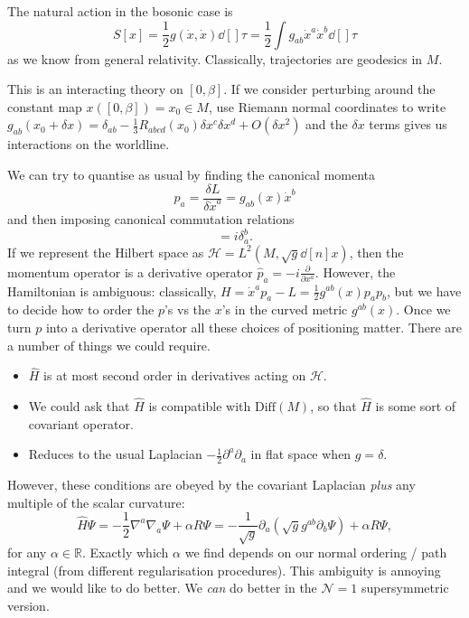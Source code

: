 The natural action in the bosonic case is
\begin{equation}
  S[x] = \frac{1}{2} g (\dot{x}, \dot{x}) \dd[]{\tau} = \frac{1}{2} \int g_{ab} \dot{x}^{a} \dot{x}^{b} \dd[]{\tau}
\end{equation}
as we know from general relativity.
Classically, trajectories are geodesics in $M$.
\begin{remark}
  This is an interacting theory on $[0, \beta]$. If we consider perturbing around the constant map $x([0, \beta]) = x_0 \in M$, use Riemann normal coordinates to write $g_{ab}(x_0 + \delta x) = \delta_{ab} - \frac{1}{3} R_{abcd} (x_0) \delta x^{c} \delta x^{d} + O(\delta x^2)$ and the $\delta x$ terms gives us interactions on the worldline.
\end{remark}
We can try to quantise as usual by finding the canonical momenta
\begin{equation}
  p_a = \frac{\delta L}{\delta \dot{x}^a} = g_{ab}(x) \dot{x}^b
\end{equation}
and then imposing canonical commutation relations
\begin{equation}
  [\hat{p}_a, \hat{x}^b] = i \delta^{b}_a.
\end{equation}
If we represent the Hilbert space as $\mathscr{H} = L^2 (M, \sqrt{g} \dd[n]{x})$, then the momentum operator is a derivative operator $\hat{p}_a = -i \frac{\partial }{\partial x^a}$.
However, the Hamiltonian is ambiguous:
classically, $H = \dot{x}^a p_a - L = \frac{1}{2} g^{ab}(x) p_a p_b$, but we have to decide how to order the $p$'s vs the $x$'s in the curved metric $g^{ab}(x)$.
Once we turn $p$ into a derivative operator all these choices of positioning matter.
There are a number of things we could require.
\begin{itemize}
  \item $\hat{H}$ is at most second order in derivatives acting on $\mathscr{H}$.
  \item We could ask that $\hat{H}$ is compatible with $\text{Diff}(M)$, so that $\hat{H}$ is some sort of covariant operator.
  \item Reduces to the usual Laplacian $-\frac{1}{2} \partial^{a} \partial_{a}$ in flat space when $g = \delta$.
\end{itemize}
However, these conditions are obeyed by the covariant Laplacian \emph{plus} any multiple of the scalar curvature: 
\begin{equation}
  \label{eq:9-r}
  \hat{H} \Psi = - \frac{1}{2} \nabla^a \nabla_a \Psi + \alpha R \Psi = -\frac{1}{\sqrt{g}} \partial_{a} (\sqrt{g} g^{ab} \partial_b \Psi) + \alpha R \Psi,
\end{equation}
for any $\alpha \in \mathbb{R}$.
Exactly which $\alpha$ we find depends on our normal ordering / path integral (from different regularisation procedures).
This ambiguity is annoying and we would like to do better. We \emph{can} do better in the $\mathcal{N} = 1$ supersymmetric version.


